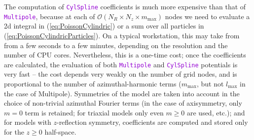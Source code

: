 \documentclass[12pt]{article}
\newcommand{\ttt}[1]{\textcolor{darkviolet}{\texttt{#1}}}
\begin{document}
The computation of \ttt{CylSpline} coefficients is much more expensive than that of \ttt{Multipole}, because at each of $\mathcal{O}(N_R\times N_z \times m_\mathrm{max})$ nodes we need to evaluate a 2d integral in (\ref{eq:PoissonCylindric}) or a sum over all particles in (\ref{eq:PoissonCylindricParticles}). On a typical workstation, this may take from from a few seconds to a few minutes, depending on the resolution and the number of CPU cores. Nevertheless, this is a one-time cost; once the coefficients are calculated, the evaluation of both \ttt{Multipole} and \ttt{CylSpline} potentials is very fast -- the cost depends very weakly on the number of grid nodes, and is proportional to the number of azimuthal-harmonic terms ($m_\mathrm{max}$, but not $l_\mathrm{max}$ in the case of Multipole).
Symmetries of the model are taken into account in the choice of non-trivial azimuthal Fourier terms (in the case of axisymmetry, only $m=0$ term is retained; for triaxial models only even $m\ge 0$ are used, etc.); and for models with $z$-reflection symmetry, coefficients are computed and stored only for the $z\ge 0$ half-space.
\end{document}
